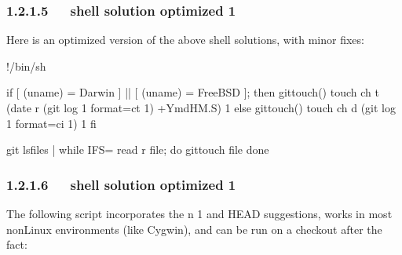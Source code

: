 \documentclass[letterpaper,12pt,english]{sphinxmanual}
\begin{document}
\subsubsection{1.2.1.5   shell solution optimized 1}
\label{\detokenize{001software/001install/001._u7f51_u7ad9/github:shell-solution-optimized-1}}
Here is an optimized version of the above shell solutions, with minor fixes:

\begin{sphinxVerbatim}[commandchars=\\\{\}]
\PYGZsh{}!/bin/sh

if [ \PYGZdq{}\PYGZdl{}(uname)\PYGZdq{} = \PYGZsq{}Darwin\PYGZsq{} ] ||
   [ \PYGZdq{}\PYGZdl{}(uname)\PYGZdq{} = \PYGZsq{}FreeBSD\PYGZsq{} ]; then
   gittouch() \PYGZob{}
      touch \PYGZhy{}ch \PYGZhy{}t \PYGZdq{}\PYGZdl{}(date \PYGZhy{}r \PYGZdq{}\PYGZdl{}(git log \PYGZhy{}1 \PYGZhy{}\PYGZhy{}format=\PYGZpc{}ct \PYGZdq{}\PYGZdl{}1\PYGZdq{})\PYGZdq{}   \PYGZsq{}+\PYGZpc{}Y\PYGZpc{}m\PYGZpc{}d\PYGZpc{}H\PYGZpc{}M.\PYGZpc{}S\PYGZsq{})\PYGZdq{} \PYGZdq{}\PYGZdl{}1\PYGZdq{}
   \PYGZcb{}
else
   gittouch() \PYGZob{}
      touch \PYGZhy{}ch \PYGZhy{}d \PYGZdq{}\PYGZdl{}(git log \PYGZhy{}1 \PYGZhy{}\PYGZhy{}format=\PYGZpc{}ci \PYGZdq{}\PYGZdl{}1\PYGZdq{})\PYGZdq{} \PYGZdq{}\PYGZdl{}1\PYGZdq{}
   \PYGZcb{}
fi

git ls\PYGZhy{}files |
   while IFS= read \PYGZhy{}r file; do
      gittouch \PYGZdq{}\PYGZdl{}file\PYGZdq{}
   done
\end{sphinxVerbatim}


\subsubsection{1.2.1.6   shell solution optimized 1}
\label{\detokenize{001software/001install/001._u7f51_u7ad9/github:id3}}
The following script incorporates the \sphinxhyphen{}n 1 and HEAD suggestions, works in most non\sphinxhyphen{}Linux environments (like Cygwin), and can be run on a checkout after the fact:
\end{document}
